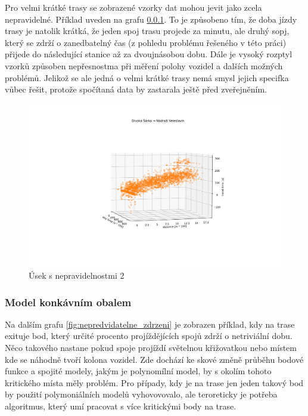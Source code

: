 Pro velmi krátké trasy se zobrazené vzorky dat mohou jevit jako zcela nepravidelné. Příklad uveden na grafu \ref{}. To je způsobeno tím, že doba jízdy trasy je natolik krátká, že jeden spoj trasu projede za minutu, ale druhý sopj, který se zdrží o zanedbatelný čas (z pohledu problému řešeného v této práci) přijede do následující stanice až za dvoujnásobou dobu. Dále je vysoký rozptyl vzorků způsoben nepřesnostma při měření polohy vozidel a dalších možných problémů. Jelikož se ale jedná o velmi krátké trasy nemá smysl jejich specifka vůbec řešit, protože spočítaná data by zastarala ještě před zveřejněním.

\begin{figure}
	\centering
  \includegraphics[width=\linewidth]{../img/divoka_sarka_veleslavin.png}
  \caption{Úsek s nepravidelnostmi 2}
  \label{fig:divoka_sarka_veleslavin}
\end{figure}

\subsubsection{Model konkávním obalem}

Na dalším grafu \ref{fig:nepredvidatelne_zdrzeni} je zobrazen příklad, kdy na trase exituje bod, který určité procento projíždějících spojů zdrží o netriviální dobu. Něco takového nastane pokud spoje projíždí světelnou křižovatkou nebo místem kde se náhodně tvoří kolona vozidel. Zde dochází ke skové změně průběhu bodové funkce a spojité modely, jakým je polynomílní model, by s okolím tohoto kritického místa měly problém. Pro případy, kdy je na trase jen jeden takový bod by použití polymoniálních modelů vyhovovovalo, ale teroreticky je potřeba algoritmus, který umí pracovat s více kritickými body na trase.

